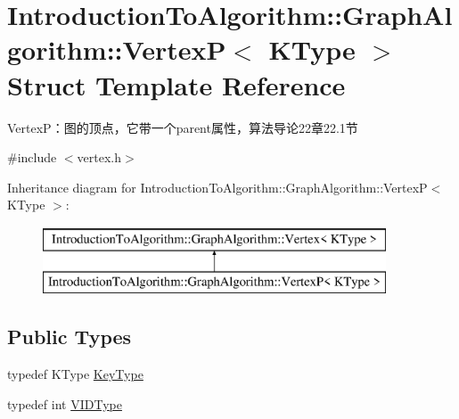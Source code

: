 \hypertarget{struct_introduction_to_algorithm_1_1_graph_algorithm_1_1_vertex_p}{}\section{Introduction\+To\+Algorithm\+:\+:Graph\+Algorithm\+:\+:Vertex\+P$<$ K\+Type $>$ Struct Template Reference}
\label{struct_introduction_to_algorithm_1_1_graph_algorithm_1_1_vertex_p}


Vertex\+P：图的顶点，它带一个parent属性，算法导论22章22.1节  




{\ttfamily \#include $<$vertex.\+h$>$}

Inheritance diagram for Introduction\+To\+Algorithm\+:\+:Graph\+Algorithm\+:\+:Vertex\+P$<$ K\+Type $>$\+:\begin{figure}[H]
\begin{center}
\leavevmode
\includegraphics[height=2.000000cm]{struct_introduction_to_algorithm_1_1_graph_algorithm_1_1_vertex_p}
\end{center}
\end{figure}
\subsection*{Public Types}
\begin{DoxyCompactItemize}
\item 
typedef K\+Type \hyperlink{struct_introduction_to_algorithm_1_1_graph_algorithm_1_1_vertex_p_aa48c040b6a076ae4e1cbd5cd51f42241}{Key\+Type}
\item 
typedef int \hyperlink{struct_introduction_to_algorithm_1_1_graph_algorithm_1_1_vertex_p_aa15e0b509772ea84c9b5a211079d641b}{V\+I\+D\+Type}
\end{DoxyCompactItemize}
